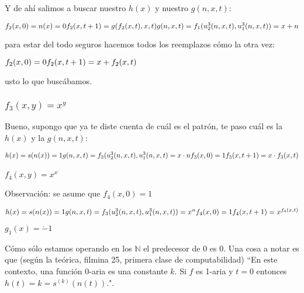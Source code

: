 \documentclass[11pt]{article} %
\newcommand{\desarrollo}[2]{

\hspace{2em}\parbox{\textwidth}{#1}

}
\newcommand{\nat}{\mathbb{N}}
\begin{document}
Y de ahí salimos a buscar nuestro $h(x)$ y nuestro $g(n,x,t)$:

\desarrollo{$
f_2(x,0)   = n(x) = 0 \\
f_2(x,t+1) = g(f_2(x,t),x,t) \\
g(n,x,t)   = f_1(u^3_2(n,x,t),u^3_1(n,x,t)) = x + n
$}

Y para estar del todo seguros hacemos todos los reemplazos cómo la otra vez:

\desarrollo{$
f_2(x,0)   = 0\\
f_2(x,t+1) = x + f_2(x,t)
$}

Justo lo que buscábamos.

\subsubsection{$f_3(x,y)=x^y$}

Bueno, supongo que ya te diste cuenta de cuál es el patrón, te paso cuál es la $h(x)$ y la $g(n,x,t)$:

\desarrollo{$
h(x)     = s(n(x)) = 1 \\
g(n,x,t) = f_2(u^3_2(n,x,t), u^3_1(n,x,t) = x \cdot n \\
\\
f_3(x,0)   = 1 \\
f_3(x,t+1) = x \cdot f_3(x,t)
$}

\subsubsection{$f_4(x,y)=x^{x^{\cdot^{\cdot^{\cdot^{^{x}}}}}}$}

Observación: se asume que $f_4(x,0)=1$

\desarrollo{$
h(x) = s(n(x)) = 1 \\
g(n,x,t) = f_3(u^3_2(n,x,t),u^3_1(n,x,t)) = x^n \\
\\
f_4(x,0) = 1 \\
f_4(x,t+1) = x^{f_4(x,t)}
$}

\subsubsection{$g_1(x)=\dot-1$}

Cómo sólo estamos operando en los $\nat$ el predecesor de 0 es 0. Una cosa a notar es que (según la teórica, filmina 25, primera clase de computabilidad) ``En este contexto, una función 0-aria es una constante $k$. Si $f$ es 1-aria y $t=0$ entonces $h(t)=k=s^{(k)}(n(t))$.".
\end{document}
